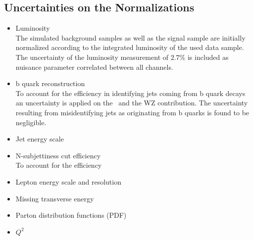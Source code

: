 \subsection*{Uncertainties on the Normalizations}
\begin{itemize}
\item Luminosity\\
The simulated background samples as well as the signal sample are initially normalized according to the integrated luminosity of the used data sample. The uncertainty of the luminosity measurement of $2.7$\% is included as nuisance parameter correlated between all channels.
\item b quark reconstruction\\
To account for the efficiency in identifying jets coming from b quark decays \cite{CSV2} an uncertainty is applied on the \ttbar \ and the WZ contribution. The uncertainty resulting from misidentifying jets as originating from b quarks is found to be negligible.
\item Jet energy scale\\

\item N-subjettiness cut efficiency\\
To account for the efficiency 
\item Lepton energy scale and resolution\\
\item Missing transverse energy\\

\item Parton distribution functions (PDF)\\
\item $Q^2$\\
\end{itemize}
